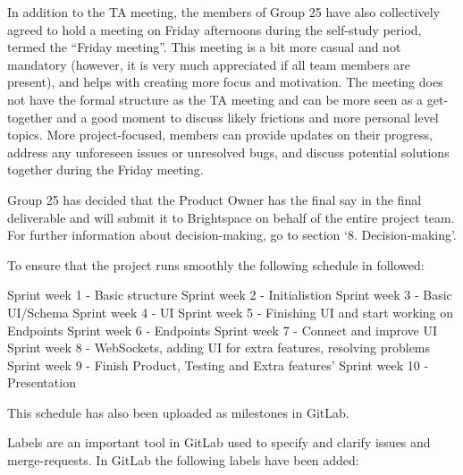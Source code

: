 \documentclass[sigconf,nonacm]{acmart}
\begin{document}
In addition to the TA meeting, the members of Group 25 have also collectively agreed to hold a meeting on Friday afternoons during the self-study period, termed the “Friday meeting”. This meeting is a bit more casual and not mandatory (however, it is very much appreciated if all team members are present), and helps with creating more focus and motivation. The meeting does not have the formal structure as the TA meeting and can be more seen as a get-together and a good moment to discuss likely frictions and more personal level topics. More project-focused, members can provide updates on their progress, address any unforeseen issues or unresolved bugs, and discuss potential solutions together during the Friday meeting.

Group 25 has decided that the Product Owner has the final say in the final deliverable and will submit it to Brightspace on behalf of the entire project team. For further information about decision-making, go to section ‘8. Decision-making’.

To ensure that the project runs smoothly the following schedule in followed:

Sprint week 1 - Basic structure
Sprint week 2 - Initialistion
Sprint week 3 - Basic UI/Schema
Sprint week 4 - UI
Sprint week 5 - Finishing UI and start working on Endpoints
Sprint week 6 - Endpoints
Sprint week 7 - Connect and improve UI
Sprint week 8 - WebSockets, adding UI for extra features, resolving problems
Sprint week 9 - Finish Product, Testing and Extra features'
Sprint week 10 - Presentation

This schedule has also been uploaded as milestones in GitLab.

Labels are an important tool in GitLab used to specify and clarify issues and merge-requests. In GitLab the following labels have been added:
\end{document}

